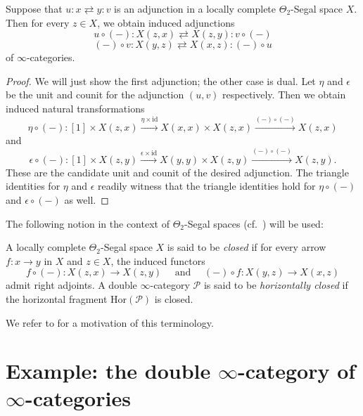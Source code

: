 \documentclass[a4paper, 11pt]{amsart}
\numberwithin{theorem}{section}
\theoremstyle{definition}
\renewcommand{\P}{\mathscr{P}}
\newcommand{\Hor}{\mathrm{Hor}}
\newcommand{\id}{\mathrm{id}}
\begin{document}
\begin{proposition}\label{prop.adjoints-mapping-cats}
Suppose that 
$u : x \rightleftarrows y : v$
is an adjunction in a locally complete $\Theta_2$-Segal space $X$. Then for every $z \in X$, 
we obtain induced adjunctions
\[
		u \circ (-) :X(z,x) \rightleftarrows X(z,y) : v \circ (-)
\]
\[
		(-) \circ v : X(y,z) \rightleftarrows X(x,z): (-) \circ u
\]
of $\infty$-categories.
\end{proposition}
\begin{proof}
We will just show the first adjunction; the other case is dual.
Let $\eta$ and $\epsilon$ be the unit and counit for the adjunction $(u,v)$ respectively. Then we obtain induced natural transformations
$$
\eta \circ (-) : [1] \times X(z,x) \xrightarrow{\eta \times \id} X(x,x) \times X(z,x) \xrightarrow{(-)\circ(-)} X(z,x)
$$
and 
$$
\epsilon \circ (-) : [1] \times X(z,y) \xrightarrow{\epsilon \times \id} X(y,y) \times X(z,y)  \xrightarrow{(-)\circ(-)} X(z,y).
$$
These are the candidate unit and counit of the desired adjunction. The triangle identities 
for $\eta$ and $\epsilon$ readily witness that the triangle identities hold for $\eta \circ (-)$ and $\epsilon \circ (-)$ as well.
\end{proof}

The following notion in the context of $\Theta_2$-Segal spaces (cf.\ \cite[Definition 5.8]{ShulmanFramedBicats}) will be used:

\begin{definition}\label{def.hor-closed}
	A locally complete $\Theta_2$-Segal space $X$ is said to be \textit{closed} if for every arrow $f : x\rightarrow y$ in $X$ and $z \in X$,
	the induced functors $$f \circ (-) : X(z,x) \rightarrow X(z,y) \quad \text { and } \quad (-) \circ f : X(y,z) \rightarrow X(x,z)$$ admit right adjoints.
	A double $\infty$-category $\P$ is said to be \textit{horizontally closed}
	if the horizontal fragment $\Hor(\P)$ is closed.
\end{definition}

We refer to \cite[Remark 5.10]{ShulmanFramedBicats} for a motivation of this terminology.

\section{Example: the double \texorpdfstring{$\infty$}{∞}-category of \texorpdfstring{$\infty$}{∞}-categories}\label{section.equipment-infty-cats}
\end{document}
